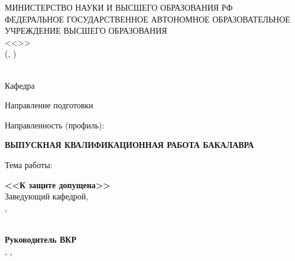 \begin{titlepage}
    \newpage
    \setlength{\baselineskip}{5mm}

    \begin{center}
        МИНИСТЕРСТВО НАУКИ И ВЫСШЕГО ОБРАЗОВАНИЯ РФ \\
        ФЕДЕРАЛЬНОЕ ГОСУДАРСТВЕННОЕ АВТОНОМНОЕ ОБРАЗОВАТЕЛЬНОЕ УЧРЕЖДЕНИЕ ВЫСШЕГО ОБРАЗОВАНИЯ \\
        \hspace{-0.5mm}<<\MakeUppercase{\universitylongsplit}>> \\
        (\MakeUppercase{\university}, \universityshort)
    \end{center}

    \begin{center}
        \faculty \\
        Кафедра \uline{\makebox[3.8cm][l]{\department}}
    \end{center}

    Направление подготовки \programnum\thinspace{\programname}

    Направленность (профиль): \thinspace{\specialization}
    \vspace{15mm} %

    \begin{center}
        \hspace{7mm}\textbf{ВЫПУСКНАЯ КВАЛИФИКАЦИОННАЯ РАБОТА БАКАЛАВРА} \\
        \textbf{\studentfortitle}
    \end{center}

    Тема работы:

    \vspace{5mm}
    \noindent\hspace*{1.3cm}
    \begin{minipage}{\dimexpr\textwidth-2.6cm}
        \setlength{\baselineskip}{5mm}
        \centering
        \MakeUppercase{\textbf{\topic}}
    \end{minipage}
    \vspace{15mm} %

    \begin{minipage}[b]{0.35\textwidth}
        \textbf{<<К защите допущена>>} \\
        Заведующий кафедрой, \\
        \apdegree, \aprank \\
        \apinfotemplate \\
        \datetemplate
    \end{minipage}
    \hspace{20mm}
    \begin{minipage}[b]{0.35\textwidth}
        \textbf{Руководитель ВКР} \\
        \sadegree, \sarank, \\
        \sansutitle \\
        \sainfotemplate \\
        \datetemplate
    \end{minipage}


\end{titlepage}
